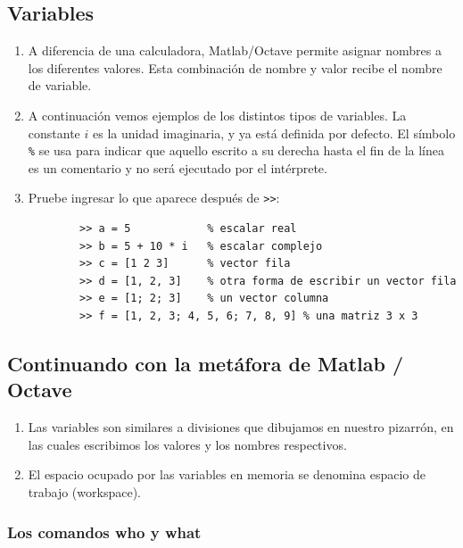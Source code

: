 \documentclass[11pt,a4paper,openany]{book}
\begin{document}
\subsection{Variables}

\begin{enumerate}
	
	\item A diferencia de una calculadora, Matlab/Octave permite asignar nombres a los diferentes valores. Esta combinación de nombre y valor recibe el nombre de variable.
	
	\item A continuación vemos ejemplos de los distintos tipos de variables. La constante $i$ es la unidad imaginaria, y ya está definida por defecto. El símbolo \texttt{\%} se usa para indicar que aquello escrito a su derecha hasta el fin de la línea es un comentario y no será ejecutado por el intérprete.
	
	\item Pruebe ingresar lo que aparece después de \verb->>-:
	\begin{verbatim}
		>> a = 5            % escalar real
		>> b = 5 + 10 * i   % escalar complejo
		>> c = [1 2 3]      % vector fila
		>> d = [1, 2, 3]    % otra forma de escribir un vector fila
		>> e = [1; 2; 3]    % un vector columna
		>> f = [1, 2, 3; 4, 5, 6; 7, 8, 9] % una matriz 3 x 3
	\end{verbatim}
\end{enumerate}

\subsection{Continuando con la metáfora de Matlab / Octave}

\begin{enumerate}
	\item Las variables son similares a divisiones que dibujamos en nuestro pizarrón, en las cuales escribimos los valores y los nombres respectivos.
	\item El espacio ocupado por las variables en memoria se denomina espacio de trabajo (workspace).
\end{enumerate}

\subsubsection{Los comandos who y what}
\end{document}
